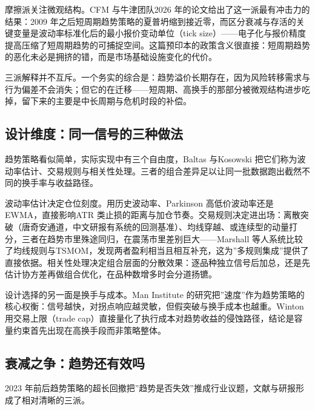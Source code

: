 \documentclass[12pt,a4paper]{ctexart}
\begin{document}
摩擦派关注微观结构。CFM 与牛津团队2026 年的论文给出了这一派最有冲击力的结果\cite{11}：2009 年之后短周期趋势策略的夏普坍缩到接近零，而区分衰减与存活的关键变量是波动率标准化后的最小报价变动单位（tick size）——电子化与报价精度提高压缩了短周期趋势的可捕捉空间。这篇预印本的政策含义很直接：短周期趋势的恶化未必是拥挤的错，而是市场基础设施变化的代价。


三派解释并不互斥。一个务实的综合是：趋势溢价长期存在，因为风险转移需求与行为偏差不会消失；但它的在迁移——短周期、高换手的那部分被微观结构进步吃掉，留下来的主要是中长周期与危机时段的补偿。


\subsection{设计维度：同一信号的三种做法}

趋势策略看似简单，实际实现中有三个自由度，Baltas 与Kosowski 把它们称为波动率估计、交易规则与相关性处理\cite{06}。三者的组合差异足以让同一批数据跑出截然不同的换手率与收益路径。


波动率估计决定仓位刻度。用历史波动率、Parkinson 高低价波动率还是EWMA，直接影响ATR 类止损的距离与加仓节奏。交易规则决定进出场：离散突破（唐奇安通道，中文研报有系统的回测基准\cite{27}）、均线穿越、或连续型的动量打分，三者在趋势市里殊途同归，在震荡市里差别巨大——Marshall 等人系统比较了均线规则与TSMOM，发现两者盈利相当且相互补充\cite{12}，这为”\hspace{0.3em}多规则集成”\hspace{0.3em}提供了直接依据。相关性处理决定组合层面的分散效果：逐品种独立信号后加总，还是先估计协方差再做组合优化，在品种数增多时会分道扬镳。


设计选择的另一面是换手与成本。Man Institute 的研究把”\hspace{0.3em}速度”\hspace{0.3em}作为趋势策略的核心权衡：信号越快，对拐点响应越灵敏，但假突破与换手成本也越重\cite{17}。Winton 用交易上限（trade cap）直接量化了执行成本对趋势收益的侵蚀路径\cite{20}，结论是容量约束首先出现在高换手段而非策略整体。


\subsection{衰减之争：趋势还有效吗}

2023 年前后趋势策略的超长回撤把”\hspace{0.3em}趋势是否失效”\hspace{0.3em}推成行业议题，文献与研报形成了相对清晰的三派。
\end{document}
